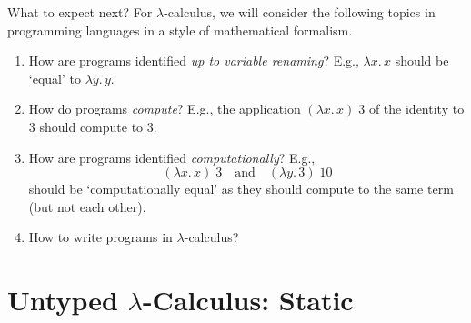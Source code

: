 \begin{frame}{What to expect next?}
  For $\lambda$-calculus, we will consider the following topics in programming languages in a style of mathematical formalism.
  \begin{enumerate}
    \item How are programs identified \emph{up to variable renaming}?
      E.g., $\lambda x.\, x$ should be `equal' to $\lambda y.\, y$.
    \item How do programs \emph{compute}?
      E.g., the application $(\lambda x.\, x)\;3$ of the identity to $3$ should compute to $3$.
    \item How are programs identified \emph{computationally}?
      E.g.,
      \[
        (\lambda x.\, x)\;3 \quad\text{and}\quad (\lambda y.\, 3)\;10
      \]
      should be `computationally equal' as they should compute to the same term (but not each other).
    \item How to write programs in $\lambda$-calculus?
  \end{enumerate}
\end{frame}

\section{Untyped \texorpdfstring{$\lambda$}{λ}-Calculus: Static}

